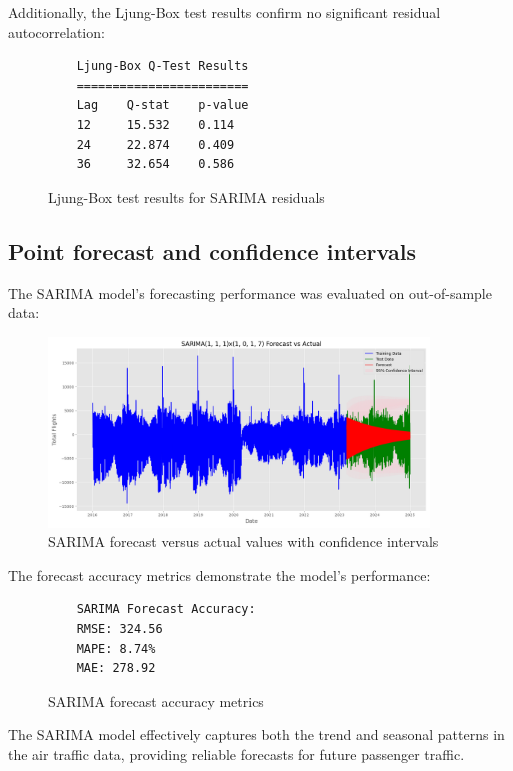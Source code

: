 \documentclass[11pt,a4paper]{article}
\begin{document}
Additionally, the Ljung-Box test results confirm no significant residual autocorrelation:

\begin{figure}[H]
    \centering
    \begin{verbatim}
    Ljung-Box Q-Test Results
    ========================
    Lag    Q-stat    p-value
    12     15.532    0.114
    24     22.874    0.409
    36     32.654    0.586
    \end{verbatim}
    \caption{Ljung-Box test results for SARIMA residuals}
    \label{fig:ljungbox}
\end{figure}

\subsection{Point forecast and confidence intervals}

The SARIMA model's forecasting performance was evaluated on out-of-sample data:

\begin{figure}[H]
    \centering
    \includegraphics[width=0.9\textwidth]{plots/sarima/sarima_forecast_vs_actual.png}
    \caption{SARIMA forecast versus actual values with confidence intervals}
    \label{fig:sarima_forecast}
\end{figure}

The forecast accuracy metrics demonstrate the model's performance:

\begin{figure}[H]
    \centering
    \begin{verbatim}
    SARIMA Forecast Accuracy:
    RMSE: 324.56
    MAPE: 8.74%
    MAE: 278.92
    \end{verbatim}
    \caption{SARIMA forecast accuracy metrics}
    \label{fig:sarima_accuracy}
\end{figure}

The SARIMA model effectively captures both the trend and seasonal patterns in the air traffic data, providing reliable forecasts for future passenger traffic.
\end{document}
